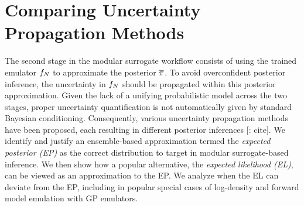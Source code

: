 \documentclass[12pt]{article}
\begin{document}
\section{Comparing Uncertainty Propagation Methods} \label{sec:compare-unc-prop}
The second stage in the modular surrogate workflow consists of using the 
trained emulator $f_{N}$ to approximate the posterior $\overline{\pi}$.
To avoid overconfident posterior inference, the uncertainty in $f_{N}$
should be propagated within this posterior approximation. Given the lack of
a unifying probabilistic model across the two stages, proper uncertainty 
quantification is not automatically given by standard Bayesian conditioning.
Consequently, various uncertainty propagation methods have been 
proposed, each resulting in different posterior inferences [\todo: cite].
We identify and justify an ensemble-based approximation termed the 
\textit{expected posterior (EP)} as the correct distribution to target in 
modular surrogate-based inference. We then show how a popular alternative,
the \textit{expected likelihood (EL)}, can be viewed as an 
approximation to the EP. We analyze when the EL can deviate from the EP,
including in popular special cases of log-density and forward model emulation
with GP emulators.
\end{document}
